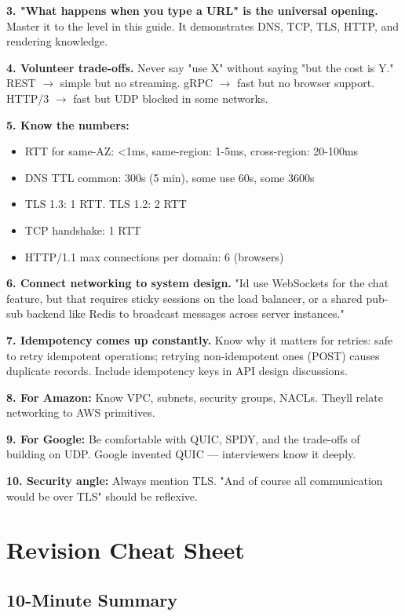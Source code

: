 \documentclass[11pt]{article}
\providecommand{\tightlist}{\setlength{\itemsep}{1pt}\setlength{\parskip}{0pt}}
\begin{document}
\textbf{3. "What happens when you type a URL" is the universal opening.} Master it to the level in this guide. It demonstrates DNS, TCP, TLS, HTTP, and rendering knowledge.

\textbf{4. Volunteer trade-offs.} Never say "use X" without saying "but the cost is Y." REST \(\rightarrow\) simple but no streaming. gRPC \(\rightarrow\) fast but no browser support. HTTP/3 \(\rightarrow\) fast but UDP blocked in some networks.

\textbf{5. Know the numbers:}

\begin{itemize}
\tightlist
\item
  RTT for same-AZ: \textless1ms, same-region: 1-5ms, cross-region: 20-100ms
\item
  DNS TTL common: 300s (5 min), some use 60s, some 3600s
\item
  TLS 1.3: 1 RTT. TLS 1.2: 2 RTT
\item
  TCP handshake: 1 RTT
\item
  HTTP/1.1 max connections per domain: 6 (browsers)
\end{itemize}

\textbf{6. Connect networking to system design.} "I\textquotesingle d use WebSockets for the chat feature, but that requires sticky sessions on the load balancer, or a shared pub-sub backend like Redis to broadcast messages across server instances."

\textbf{7. Idempotency comes up constantly.} Know why it matters for retries: safe to retry idempotent operations; retrying non-idempotent ones (POST) causes duplicate records. Include idempotency keys in API design discussions.

\textbf{8. For Amazon:} Know VPC, subnets, security groups, NACLs. They\textquotesingle ll relate networking to AWS primitives.

\textbf{9. For Google:} Be comfortable with QUIC, SPDY, and the trade-offs of building on UDP. Google invented QUIC --- interviewers know it deeply.

\textbf{10. Security angle:} Always mention TLS. "And of course all communication would be over TLS" should be reflexive.

\section{Revision Cheat Sheet}\label{revision-cheat-sheet}

\subsection{10-Minute Summary}\label{10-minute-summary}
\end{document}
